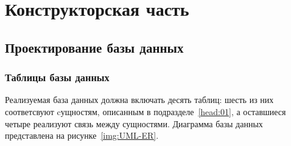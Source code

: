 \chapter{\label{design}Конструкторская часть}

\section{Проектирование базы данных}
\subsection{Таблицы базы данных}

Реализуемая база данных должна включать десять таблиц: шесть из них соответсвуют
cущностям, описанным в подразделе~\ref{head:01}, а оставшиеся четыре реализуют
связь между сущностями. Диаграмма базы данных представлена на
рисунке~\ref{img:UML-ER}.


